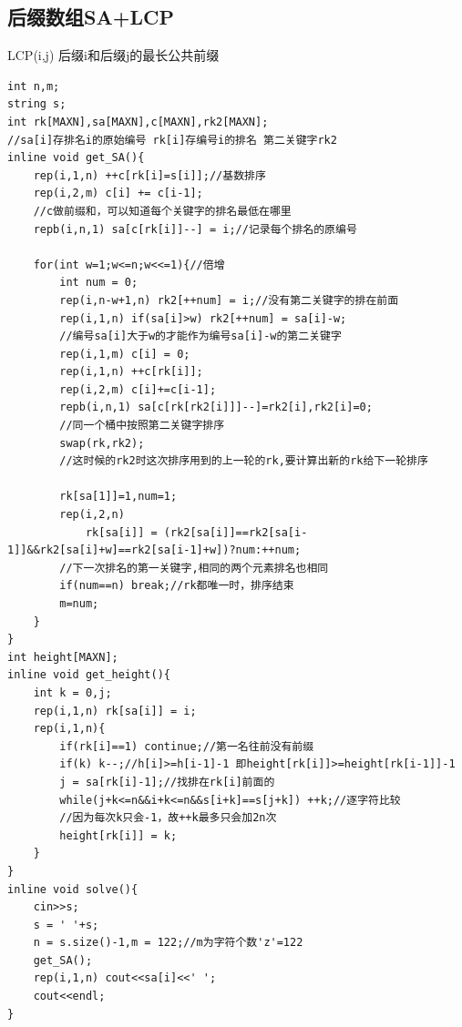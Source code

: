 \documentclass[a4]{ctexart}
\begin{document}
\subsection{后缀数组SA+LCP}
LCP(i,j) 后缀i和后缀j的最长公共前缀
\begin{lstlisting}
int n,m;
string s;
int rk[MAXN],sa[MAXN],c[MAXN],rk2[MAXN];
//sa[i]存排名i的原始编号 rk[i]存编号i的排名 第二关键字rk2
inline void get_SA(){
    rep(i,1,n) ++c[rk[i]=s[i]];//基数排序
    rep(i,2,m) c[i] += c[i-1];
    //c做前缀和，可以知道每个关键字的排名最低在哪里
    repb(i,n,1) sa[c[rk[i]]--] = i;//记录每个排名的原编号

    for(int w=1;w<=n;w<<=1){//倍增
        int num = 0;
        rep(i,n-w+1,n) rk2[++num] = i;//没有第二关键字的排在前面
        rep(i,1,n) if(sa[i]>w) rk2[++num] = sa[i]-w;
        //编号sa[i]大于w的才能作为编号sa[i]-w的第二关键字
        rep(i,1,m) c[i] = 0;
        rep(i,1,n) ++c[rk[i]];
        rep(i,2,m) c[i]+=c[i-1];
        repb(i,n,1) sa[c[rk[rk2[i]]]--]=rk2[i],rk2[i]=0;
        //同一个桶中按照第二关键字排序
        swap(rk,rk2);
        //这时候的rk2时这次排序用到的上一轮的rk,要计算出新的rk给下一轮排序

        rk[sa[1]]=1,num=1;
        rep(i,2,n)
            rk[sa[i]] = (rk2[sa[i]]==rk2[sa[i-1]]&&rk2[sa[i]+w]==rk2[sa[i-1]+w])?num:++num;
        //下一次排名的第一关键字,相同的两个元素排名也相同
        if(num==n) break;//rk都唯一时，排序结束
        m=num;
    }
}
int height[MAXN];
inline void get_height(){
    int k = 0,j;
    rep(i,1,n) rk[sa[i]] = i;
    rep(i,1,n){
        if(rk[i]==1) continue;//第一名往前没有前缀
        if(k) k--;//h[i]>=h[i-1]-1 即height[rk[i]]>=height[rk[i-1]]-1
        j = sa[rk[i]-1];//找排在rk[i]前面的
        while(j+k<=n&&i+k<=n&&s[i+k]==s[j+k]) ++k;//逐字符比较
        //因为每次k只会-1，故++k最多只会加2n次
        height[rk[i]] = k;
    }
}
inline void solve(){
    cin>>s;
    s = ' '+s;
    n = s.size()-1,m = 122;//m为字符个数'z'=122
    get_SA();
    rep(i,1,n) cout<<sa[i]<<' ';
    cout<<endl;
}
\end{lstlisting}
\end{document}
